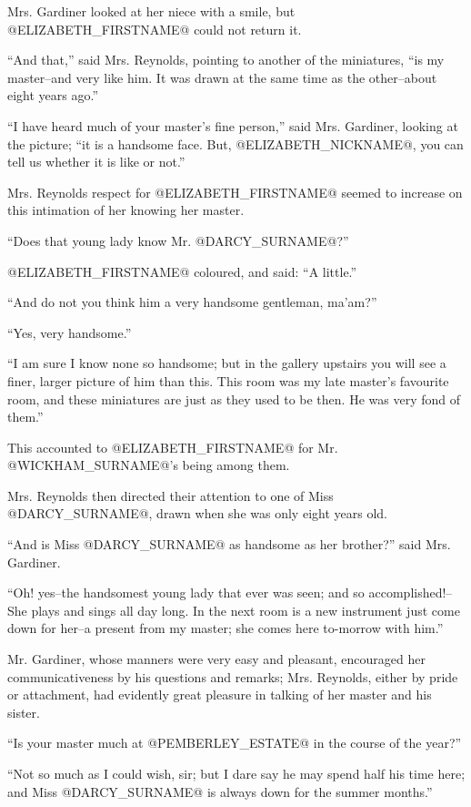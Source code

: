 Mrs. Gardiner looked at her niece with a smile, but @ELIZABETH_FIRSTNAME@ could not
return it.

``And that,'' said Mrs. Reynolds, pointing to another of the miniatures,
``is my master--and very like him. It was drawn at the same time as the
other--about eight years ago.''

``I have heard much of your master's fine person,'' said Mrs. Gardiner,
looking at the picture; ``it is a handsome face. But, @ELIZABETH_NICKNAME@, you can tell
us whether it is like or not.''

Mrs. Reynolds respect for @ELIZABETH_FIRSTNAME@ seemed to increase on this
intimation of her knowing her master.

``Does that young lady know Mr. @DARCY_SURNAME@?''

@ELIZABETH_FIRSTNAME@ coloured, and said: ``A little.''

``And do not you think him a very handsome gentleman, ma'am?''

``Yes, very handsome.''

``I am sure I know none so handsome; but in the gallery upstairs you
will see a finer, larger picture of him than this. This room was my late
master's favourite room, and these miniatures are just as they used to
be then. He was very fond of them.''

This accounted to @ELIZABETH_FIRSTNAME@ for Mr. @WICKHAM_SURNAME@'s being among them.

Mrs. Reynolds then directed their attention to one of Miss @DARCY_SURNAME@, drawn
when she was only eight years old.

``And is Miss @DARCY_SURNAME@ as handsome as her brother?'' said Mrs. Gardiner.

``Oh! yes--the handsomest young lady that ever was seen; and so
accomplished!--She plays and sings all day long. In the next room is
a new instrument just come down for her--a present from my master; she
comes here to-morrow with him.''

Mr. Gardiner, whose manners were very easy and pleasant, encouraged her
communicativeness by his questions and remarks; Mrs. Reynolds, either
by pride or attachment, had evidently great pleasure in talking of her
master and his sister.

``Is your master much at @PEMBERLEY_ESTATE@ in the course of the year?''

``Not so much as I could wish, sir; but I dare say he may spend half his
time here; and Miss @DARCY_SURNAME@ is always down for the summer months.''

